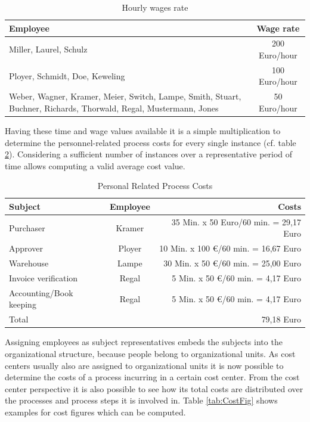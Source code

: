 \begin{table}[htbp]
	\centering
	\begin{tabular}{|p{10.0 cm } |c|}
		\hline
		\textbf{Employee} & \textbf{Wage rate} \\
		\hline
		\hline
		Miller, Laurel, Schulz & 200 Euro/hour\\
		\hline
		Ployer, Schmidt, Doe, Keweling & 100 Euro/hour\\
		\hline
		Weber, Wagner, Kramer, Meier, Switch, Lampe, Smith, Stuart, Buchner, Richards, Thorwald, Regal, Mustermann, Jones & 50 Euro/hour\\
		\hline
	\end{tabular}
\label{tab:HourlyWages}
\caption{Hourly wages rate}
\end{table}



Having these time and wage values available it is a simple multiplication to determine the personnel-related process costs for every single instance (cf. table \ref{tab:ProcessCosts}). Considering a sufficient number of instances over a representative period of time allows computing a valid average cost value.

\begin{table}[htbp]
	\centering
	\begin{tabular}{|p{5.0 cm } |c|r|}
		\hline
		\textbf{Subject} & \textbf{Employee} & \textbf{Costs}\\
		\hline
		\hline
		Purchaser & Kramer & 35 Min. x 50 Euro/60 min.  =  29,17 Euro\\
		\hline
		Approver & Ployer & 10 Min. x 100 €/60 min. =  16,67 Euro\\
		\hline
		Warehouse & Lampe & 30 Min. x 50 €/60 min.  =  25,00 Euro\\
		\hline
		Invoice verification & Regal & 5 Min. x 50 €/60 min.    =    4,17 Euro\\
		\hline
		Accounting/Book keeping & Regal & 5 Min. x 50 €/60 min.    =    4,17 Euro\\
		\hline
		Total & & 79,18 Euro\\
		\hline
	\end{tabular}
\label{tab:ProcessCosts}
\caption{Personal Related Process Costs}
\end{table}

Assigning employees as subject representatives embeds the subjects into the organizational structure, because people belong to organizational units. As cost centers usually also are assigned to organizational units it is now possible to determine the costs of a process incurring in a certain cost center. From the cost center perspective it is also possible to see how its total costs are distributed over the processes and process steps it is involved in. Table \ref{tab:CostFig} shows examples for cost figures which can be computed.

